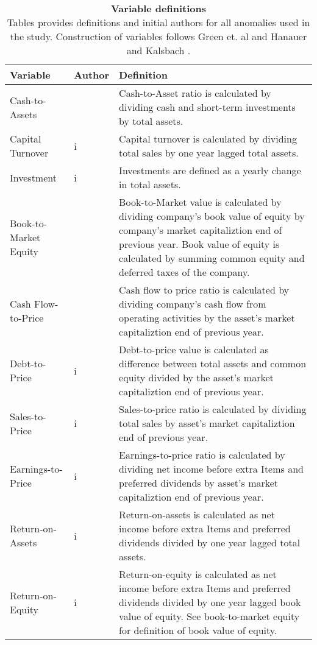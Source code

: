 \documentclass{article}
\begin{document}
\begin{table}[h] 
\small
\caption[Variable definitions]{\textbf{Variable definitions} \\Tables provides definitions and initial authors for all anomalies used in the study. Construction of variables follows Green et. al \protect\citeyear{Green2017} and Hanauer and Kalsbach \protect\citeyear{HANAUER2022}.}
\label{table:variableDefs}
\centering
\begin{tabularx}{\textwidth}{l X X}
\toprule
Variable & Author & Definition\\
\midrule
Cash-to-Assets 		& \cite{PALAZZO2012162} 	& Cash-to-Asset ratio is calculated by dividing  cash and short-term investments by total assets.\\
Capital Turnover 		& i						& Capital turnover is calculated by dividing total sales by one year lagged total assets.\\
Investment 			& i						& Investments are defined as a yearly change in total assets.\\	
Book-to-Market Equity 	& \cite{Rosenberg1985} 		&  Book-to-Market value is calculated by dividing company's book value of equity by company's market 										 	capitaliztion end of previous year. Book value of equity is calculated by summing common 												equity and deferred taxes of the company. \\
Cash Flow-to-Price 		& \cite{LAKONISHOK1994} 	& Cash flow to price ratio is calculated by dividing company's cash flow from operating activities 												by the asset's market capitaliztion end of previous year. \\
Debt-to-Price			& i						& Debt-to-price value is calculated as difference between total assets and common equity 													divided by the asset's market capitaliztion end of previous year.\\
Sales-to-Price 			& i						& Sales-to-price ratio is calculated by dividing total sales by asset's market capitaliztion end of 													previous year.\\
Earnings-to-Price 		& i						& Earnings-to-price ratio is calculated by dividing net income before extra Items and preferred 													dividends by asset's market capitaliztion end of previous year.\\
Return-on-Assets 		& i						& Return-on-assets is calculated as net income before extra Items and preferred dividends divided 												by one year lagged total assets.\\
Return-on-Equity 		& i						& Return-on-equity is calculated as net income before extra Items and preferred dividends divided 												by one year lagged book value of equity. See book-to-market equity for definition of book 													value of equity. \\

\end{tabularx}
\end{table}
\end{document}
